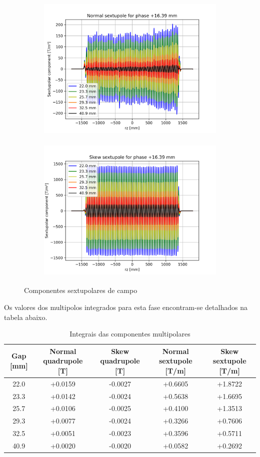 \documentclass[a4paper,12pt]{article}
\begin{document}
\begin{figure}[H]
\begin{subfigure}{0.5\textwidth}
\includegraphics[width=0.9\linewidth, height=7cm]{figs/phase16 Normal sextupole.png} 
\label{fig:subim116s}
\end{subfigure}
\begin{subfigure}{0.5\textwidth}
\includegraphics[width=0.9\linewidth, height=7cm]{figs/phase16 Skew sextupole.png}
\label{fig:subim216s}
\end{subfigure}
\caption{Componentes sextupolares de campo}
\label{fig:sext16}
\end{figure}

Os valores dos multipolos integrados para esta fase encontram-se detalhados na tabela abaixo.

\begin{table}[H]\footnotesize
\caption{Integrais das componentes multipolares}
\centering
\begin{tabular}{|c|c|c|c|c|}
\hline
   Gap [mm] &   Normal quadrupole [T] &   Skew quadrupole [T] &   Normal sextupole [T/m] &   Skew sextupole [T/m] \\
\hline
22.0 & +0.0159 & -0.0027 & +0.6605 & +1.8722 \\
23.3 & +0.0142 & -0.0024 & +0.5638 & +1.6695 \\
25.7 & +0.0106 & -0.0025 & +0.4100 & +1.3513 \\
29.3 & +0.0077 & -0.0024 & +0.3266 & +0.7606 \\
32.5 & +0.0051 & -0.0023 & +0.3596 & +0.5711 \\
40.9 & +0.0020 & -0.0020 & +0.0582 & +0.2692 \\
\hline
\end{tabular}
\end{table}
\end{document}
